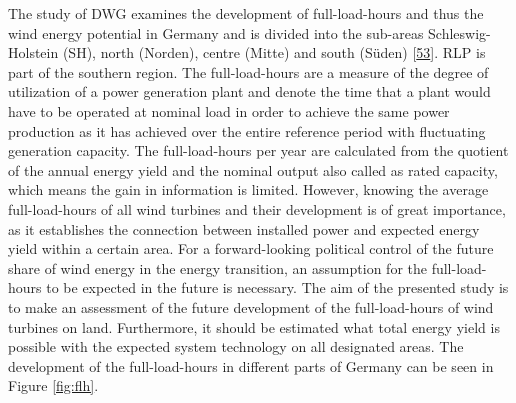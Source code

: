 \documentclass[a4paper,11pt]{article}
\begin{document}
The study of DWG examines the development of full-load-hours and thus the wind energy potential in Germany and is divided into the sub-areas Schleswig-Holstein (SH), north (Norden), centre (Mitte) and south (Süden) {[}\protect\hyperlink{ref-RasmusBorrmannDr.KnudRehfeldtDr.DennisKruse.2020}{53}{]}. RLP is part of the southern region. The full-load-hours are a measure of the degree of utilization of a power generation plant and denote the time that a plant would have to be operated at nominal load in order to achieve the same power production as it has achieved over the entire reference period with fluctuating generation capacity. The full-load-hours per year are calculated from the quotient of the annual energy yield and the nominal output also called as rated capacity, which means the gain in information is limited. However, knowing the average full-load-hours of all wind turbines and their development is of great importance, as it establishes the connection between installed power and expected energy yield within a certain area. For a forward-looking political control of the future share of wind energy in the energy transition, an assumption for the full-load-hours to be expected in the future is necessary. The aim of the presented study is to make an assessment of the future development of the full-load-hours of wind turbines on land. Furthermore, it should be estimated what total energy yield is possible with the expected system technology on all designated areas. The development of the full-load-hours in different parts of Germany can be seen in Figure \ref{fig:flh}.
\end{document}
